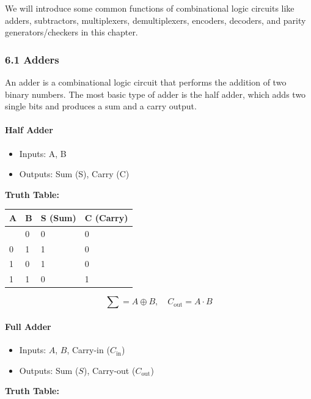 \documentclass[
  a4paper,
]{article}
\providecommand{\tightlist}{%
  \setlength{\itemsep}{0pt}\setlength{\parskip}{0pt}}
\begin{document}
We will introduce some common functions of combinational logic circuits
like adders, subtractors, multiplexers, demultiplexers, encoders,
decoders, and parity generators/checkers in this chapter.

\subsubsection{6.1 Adders}\label{adders}

An adder is a combinational logic circuit that performs the addition of
two binary numbers. The most basic type of adder is the half adder,
which adds two single bits and produces a sum and a carry output.

\paragraph{Half Adder}\label{half-adder}

\begin{itemize}
\tightlist
\item
  Inputs: A, B
\item
  Outputs: Sum (S), Carry (C)
\end{itemize}

\textbf{Truth Table:}

\begin{longtable}[]{@{}llll@{}}
\toprule\noalign{}
A & B & S (Sum) & C (Carry) \\
\midrule\noalign{}
\endhead
\bottomrule\noalign{}
\endlastfoot
0 & 0 & 0 & 0 \\
0 & 1 & 1 & 0 \\
1 & 0 & 1 & 0 \\
1 & 1 & 0 & 1 \\
\end{longtable}

\[ \sum = A \oplus B , \quad C_{\text{out}} = A \cdot B \]

\paragraph{Full Adder}\label{full-adder}

\begin{itemize}
\tightlist
\item
  Inputs: \(A\), \(B\), Carry-in (\(C_{\text{in}}\))
\item
  Outputs: Sum (\(S\)), Carry-out (\(C_{\text{out}}\))
\end{itemize}

\textbf{Truth Table:}
\end{document}
